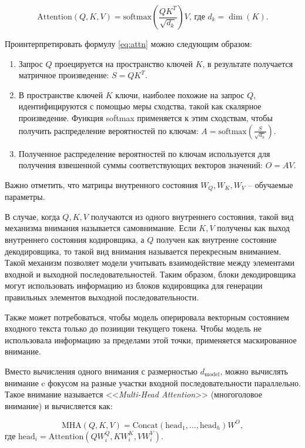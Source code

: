 \begin{equation}
    \text{Attention}\left(Q,K,V\right) = \text{softmax}\left(\frac{QK^T}{\sqrt{d_k}}\right)V\text{, где }d_k = \dim(K).
    \label{eq:attn}
\end{equation}

Проинтерпретировать формулу \ref{eq:attn} можно следующим образом:

\begin{enumerate}
    \item Запрос $Q$ проецируется на пространство ключей $K$, в результате получается матричное произведение: $S = QK^T$.
    \item В пространстве ключей $K$ ключи, наиболее похожие на запрос $Q$, идентифицируются с помощью меры сходства, такой как скалярное произведение. Функция softmax применяется к этим сходствам, чтобы получить распределение вероятностей по ключам: $A=\text{softmax}\left(\frac{S}{\sqrt{d_k}}\right)$.
    \item Полученное распределение вероятностей по ключам используется для получения взвешенной суммы соответствующих векторов значений: $O=AV$.
\end{enumerate}

Важно отметить, что матрицы внутренного состояния $W_Q,W_K,W_V$ -- обучаемые параметры.

В случае, когда $Q, K, V$ получаются из одного внутреннего состояния, такой вид механизма внимания называется самовнимание. Если $K, V$ получены как выход внутреннего состояния кодировщика, а $Q$ получен как внутренне состояние декодировщика, то такой вид внимания называется перекресным вниманием. Такой механизм позволяет модели учитывать взаимодействие между элементами входной и выходной последовательностей. Таким образом, блоки декодировщика могут использовать информацию из блоков кодировщика для генерации правильных элементов выходной последовательности.

Также может потребоваться, чтобы модель оперировала векторным состоянием входного текста только до позииции текущего токена. Чтобы модель не использовала информацию за пределами этой точки, применяется маскированное внимание.

Вместо вычисления одного внимания с размерностью $d_{\text{model}}$, можно вычислять внимание c фокусом на разные участки входной последовательности параллельно. Такое внимание называется <<\textit{Multi-Head Attention}>> (многоголовое внимание) и вычисляется как:

\begin{equation}
    \text{MHA}(Q, K, V) = \text{Concat}(\text{head}_1, \dots, \text{head}_h) W^O,
\end{equation}
где $\text{head}_i = \text{Attention}(QW_i^Q, KW_i^K, VW_i^V)$.

